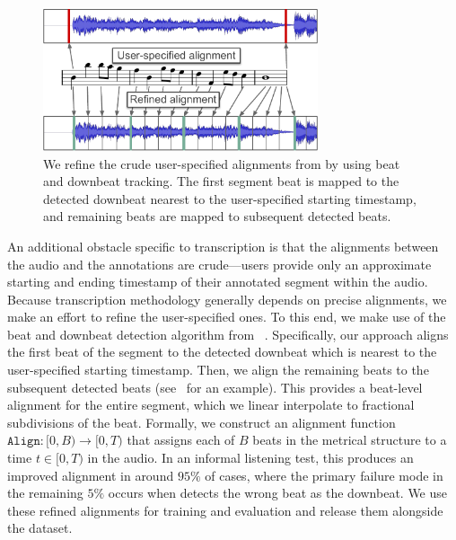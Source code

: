 \begin{figure}
    \centering
    \includegraphics[width=8.1cm]{figs/alignment.pdf}
    \caption{We refine the crude user-specified alignments from \hooktheory{} by using beat and downbeat tracking. The first segment beat is mapped to the detected downbeat nearest to the user-specified starting timestamp, and remaining beats are mapped to subsequent detected beats.}
 \label{fig:alignment}
\end{figure}

An additional obstacle specific to transcription is that the alignments between the audio and the annotations are crude---users provide only an approximate starting and ending timestamp of their annotated segment within the audio. 
Because transcription methodology generally depends on precise alignments, we make an effort to refine the user-specified ones. 
To this end, we make use of the beat and downbeat detection algorithm from \madmom{}~\cite{bock2016joint,bock2016madmom}. 
Specifically, our approach aligns the first beat of the segment to the detected downbeat which is nearest to the user-specified starting timestamp. 
Then, we align the remaining beats to the subsequent detected beats (see~ for an example). 
This provides a beat-level alignment for the entire segment, which we linear interpolate to fractional subdivisions of the beat. 
Formally, we construct an alignment function $\texttt{Align} : [0,B) \to [0,T)$ that assigns each of $B$ beats in the metrical structure to a time $t \in [0,T)$ in the audio.
In an informal listening test, this produces an improved alignment in around $95\%$ of cases, where the primary failure mode in the remaining $5\%$ occurs when \madmom{} detects the wrong beat as the downbeat. 
We use these refined alignments for training and evaluation and release them alongside the dataset.
